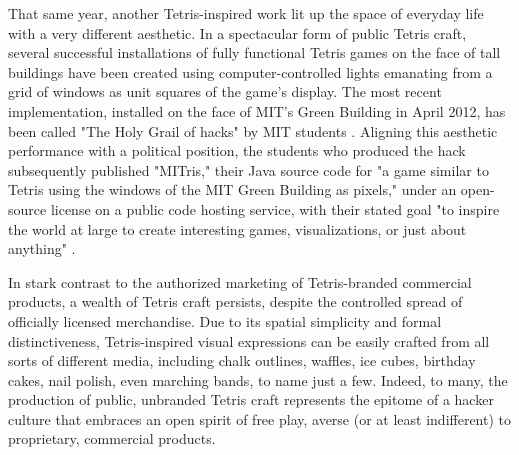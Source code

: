 That same year, another Tetris-inspired work lit up the space of everyday life with a very different aesthetic. In a spectacular form of public Tetris craft, several successful installations of fully functional Tetris games on the face of tall buildings have been created using computer-controlled lights emanating from a grid of windows as unit squares of the game's display. The most recent implementation, installed on the face of MIT's Green Building in April 2012, has been called "The Holy Grail of hacks" by MIT students \autocite[8--9]{Pourian2012}. Aligning this aesthetic performance with a political position, the students who produced the hack subsequently published "MITris," their Java source code for "a game similar to Tetris using the windows of the MIT Green Building as pixels," under an open-source license on a public code hosting service, with their stated goal "to inspire the world at large to create interesting games, visualizations, or just about anything" \autocite{mitrisdev2012}.

In stark contrast to the authorized marketing of Tetris-branded commercial products, a wealth of Tetris craft persists, despite the controlled spread of officially licensed merchandise. Due to its spatial simplicity and formal distinctiveness, Tetris-inspired visual expressions can be easily crafted from all sorts of different media, including chalk outlines, waffles, ice cubes, birthday cakes, nail polish, even marching bands, to name just a few. Indeed, to many, the production of public, unbranded Tetris craft represents the epitome of a hacker culture that embraces an open spirit of free play, averse (or at least indifferent) to proprietary, commercial products.

